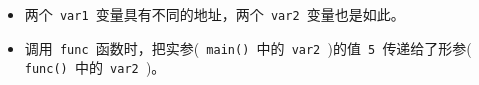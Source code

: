 \begin{frame}[fragile]\ft{\secname}
\begin{itemize}
\item 两个\lstinline| var1 |变量具有不同的地址，两个\lstinline| var2 |变量也是如此。\\[0.1in]
\item 调用\lstinline| func |函数时，把实参(\lstinline| main() |中的\lstinline| var2 |)的值\lstinline| 5 |传递给了形参(\lstinline| func() |中的\lstinline| var2 |)。 \vspace{.1in}

\end{itemize}
\end{frame}


